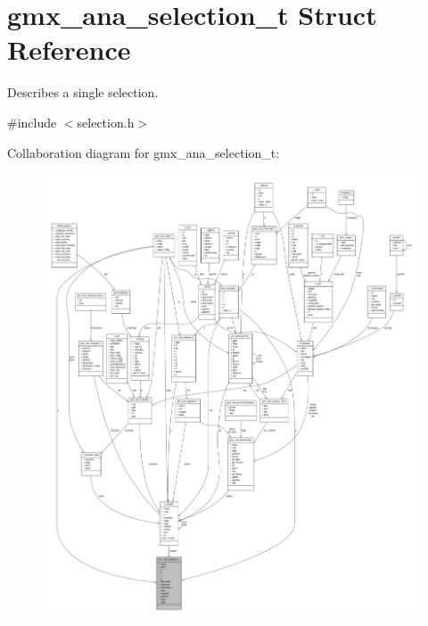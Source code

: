 \hypertarget{structgmx__ana__selection__t}{\section{gmx\-\_\-ana\-\_\-selection\-\_\-t \-Struct \-Reference}
\label{structgmx__ana__selection__t}
}


\-Describes a single selection.  




{\ttfamily \#include $<$selection.\-h$>$}



\-Collaboration diagram for gmx\-\_\-ana\-\_\-selection\-\_\-t\-:
\nopagebreak
\begin{figure}[H]
\begin{center}
\leavevmode
\includegraphics[width=350pt]{structgmx__ana__selection__t__coll__graph}
\end{center}
\end{figure}
